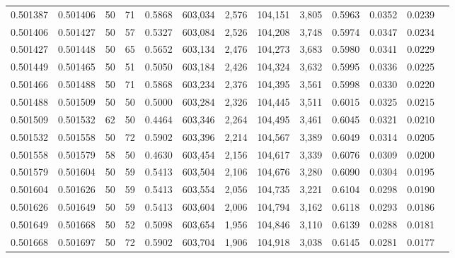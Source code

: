 \begin{tabular}{rrrrrrrrrrrrr}
0.501387 & 0.501406 &    50 &  71 &                                     0.5868 & 603,034 &   2,576 & 104,151 &   3,805 & 0.5963 & 0.0352 & 0.0239 \\
0.501406 & 0.501427 &    50 &  57 &                                     0.5327 & 603,084 &   2,526 & 104,208 &   3,748 & 0.5974 & 0.0347 & 0.0234 \\
0.501427 & 0.501448 &    50 &  65 &                                     0.5652 & 603,134 &   2,476 & 104,273 &   3,683 & 0.5980 & 0.0341 & 0.0229 \\
0.501449 & 0.501465 &    50 &  51 &                                     0.5050 & 603,184 &   2,426 & 104,324 &   3,632 & 0.5995 & 0.0336 & 0.0225 \\
0.501466 & 0.501488 &    50 &  71 &                                     0.5868 & 603,234 &   2,376 & 104,395 &   3,561 & 0.5998 & 0.0330 & 0.0220 \\
0.501488 & 0.501509 &    50 &  50 &                                     0.5000 & 603,284 &   2,326 & 104,445 &   3,511 & 0.6015 & 0.0325 & 0.0215 \\
0.501509 & 0.501532 &    62 &  50 &                                     0.4464 & 603,346 &   2,264 & 104,495 &   3,461 & 0.6045 & 0.0321 & 0.0210 \\
0.501532 & 0.501558 &    50 &  72 &                                     0.5902 & 603,396 &   2,214 & 104,567 &   3,389 & 0.6049 & 0.0314 & 0.0205 \\
0.501558 & 0.501579 &    58 &  50 &                                     0.4630 & 603,454 &   2,156 & 104,617 &   3,339 & 0.6076 & 0.0309 & 0.0200 \\
0.501579 & 0.501604 &    50 &  59 &                                     0.5413 & 603,504 &   2,106 & 104,676 &   3,280 & 0.6090 & 0.0304 & 0.0195 \\
0.501604 & 0.501626 &    50 &  59 &                                     0.5413 & 603,554 &   2,056 & 104,735 &   3,221 & 0.6104 & 0.0298 & 0.0190 \\
0.501626 & 0.501649 &    50 &  59 &                                     0.5413 & 603,604 &   2,006 & 104,794 &   3,162 & 0.6118 & 0.0293 & 0.0186 \\
0.501649 & 0.501668 &    50 &  52 &                                     0.5098 & 603,654 &   1,956 & 104,846 &   3,110 & 0.6139 & 0.0288 & 0.0181 \\
0.501668 & 0.501697 &    50 &  72 &                                     0.5902 & 603,704 &   1,906 & 104,918 &   3,038 & 0.6145 & 0.0281 & 0.0177 \\

\end{tabular}
